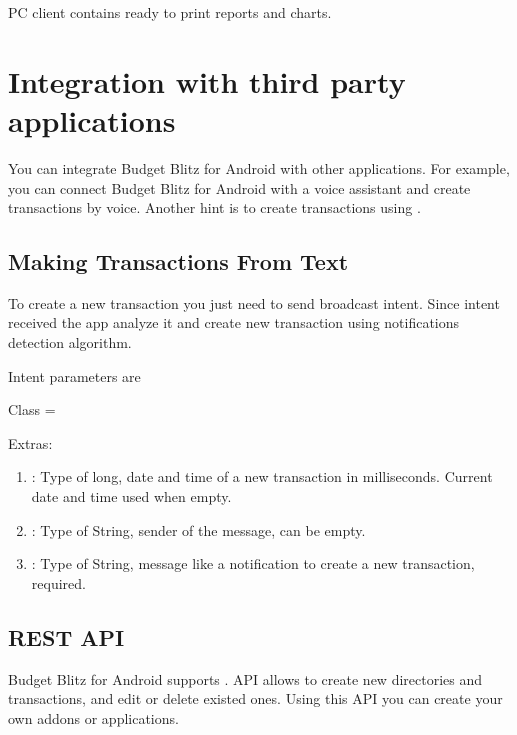 \documentclass[a4paper,10pt,english]{sphinxmanual}
\begin{document}
\sphinxAtStartPar
PC client contains ready to print reports and charts.

\sphinxstepscope


\chapter{Integration with third party applications}
\label{\detokenize{api:integration-with-third-party-applications}}\label{\detokenize{api:chapter-api}}\label{\detokenize{api::doc}}
\sphinxAtStartPar
You can integrate Budget Blitz for Android with other applications. For example, you can connect Budget Blitz for Android
with a voice assistant and create transactions by voice. Another hint is to create
transactions using .


\section{Making Transactions From Text}
\label{\detokenize{api:making-transactions-from-text}}
\sphinxAtStartPar
To create a new transaction you just need to send broadcast intent. Since intent received the app analyze it
and create new transaction using notifications detection algorithm.

\sphinxAtStartPar
Intent parameters are

\sphinxAtStartPar
Class = 

\sphinxAtStartPar
Extras:
\begin{enumerate}
%
\item {} 
\sphinxAtStartPar
{}: Type of long, date and time of a new transaction in milliseconds. Current date and time used when empty.

\item {} 
\sphinxAtStartPar
{}: Type of String, sender of the message, can be empty.

\item {} 
\sphinxAtStartPar
{}: Type of String, message like a notification to create a new transaction, required.

\end{enumerate}


\section{REST API}
\label{\detokenize{api:rest-api}}\label{\detokenize{api:sub-chapter-rest-api}}
\sphinxAtStartPar
Budget Blitz for Android supports . API allows to create new directories and transactions, and edit or delete existed ones. Using
this API you can create your own addons or applications.
\end{document}
